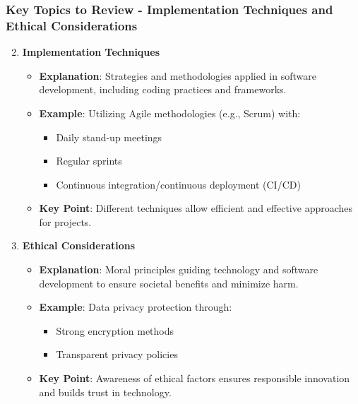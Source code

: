 \documentclass[aspectratio=169]{beamer}
\begin{document}
\begin{frame}[fragile]
    \frametitle{Key Topics to Review - Implementation Techniques and Ethical Considerations}
    \begin{enumerate}
        \setcounter{enumi}{1}
        \item \textbf{Implementation Techniques}
        \begin{itemize}
            \item \textbf{Explanation}: Strategies and methodologies applied in software development, including coding practices and frameworks.
            \item \textbf{Example}: Utilizing Agile methodologies (e.g., Scrum) with:
            \begin{itemize}
                \item Daily stand-up meetings
                \item Regular sprints
                \item Continuous integration/continuous deployment (CI/CD)
            \end{itemize}
            \item \textbf{Key Point}: Different techniques allow efficient and effective approaches for projects.
        \end{itemize}

        \item \textbf{Ethical Considerations}
        \begin{itemize}
            \item \textbf{Explanation}: Moral principles guiding technology and software development to ensure societal benefits and minimize harm.
            \item \textbf{Example}: Data privacy protection through:
            \begin{itemize}
                \item Strong encryption methods
                \item Transparent privacy policies
            \end{itemize}
            \item \textbf{Key Point}: Awareness of ethical factors ensures responsible innovation and builds trust in technology.
        \end{itemize}
    \end{enumerate}
\end{frame}
\end{document}
